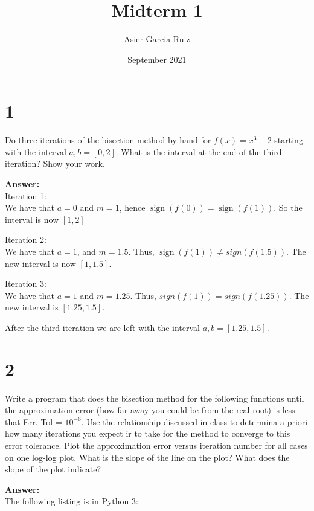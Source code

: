 \documentclass{article}
\title{Midterm 1}
\author{Asier Garcia Ruiz }
\date{September 2021}
\DeclareMathOperator{\sign}{sign}
\begin{document}
\maketitle

\section*{1}
Do three iterations of the bisection method by hand for $f(x) = x^3 - 2$
starting with the interval $a,b = [0,2]$. What is the interval at the end
of the third iteration? Show your work.

\textbf{Answer:}\\
Iteration 1:\\
We have that $a=0$ and $m = 1$, hence $\sign(f(0)) =\sign(f(1))$. So the interval
is now $[1,2]$

Iteration 2:\\
We have that $a = 1$, and $m = 1.5$. Thus, $\sign(f(1)) \neq sign(f(1.5))$. The
new interval is now $[1,1.5]$.

Iteration 3:\\
We have that $a=1$ and $m= 1.25$. Thus, $sign(f(1)) = sign(f(1.25))$. The new
interval is $[1.25,1.5]$.

After the third iteration we are left with the interval $a,b = [1.25,1.5]$.

\section*{2}
Write a program that does the bisection method for the following functions
until the approximation error (how far away you could be from the real root)
is less that Err. Tol = $10^{-6}$. Use the relationship discussed in class to
determina a priori how many iterations you expect ir to take for the method to
converge to this error tolerance. Plot the approximation error versus
iteration number for all cases on one log-log plot. What is the slope of the
line on the plot? What does the slope of the plot indicate?

\textbf{Answer:}\\
The following listing is in Python 3:
\end{document}
